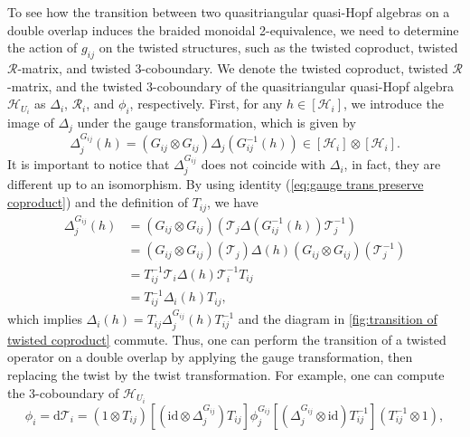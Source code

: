 \documentclass[reqno]{amsart}
\theoremstyle{definition}
\theoremstyle{remark}
\begin{document}
To see how the transition between two quasitriangular quasi-Hopf algebras on a double overlap induces the braided monoidal 2-equivalence, we need to determine the action of $g_{ij}$ on the twisted structures, such as the twisted coproduct, twisted $\mathcal{R}$-matrix, and twisted 3-coboundary. We denote the twisted coproduct, twisted $\mathcal{R}$-matrix, and the twisted 3-coboundary of the quasitriangular quasi-Hopf algebra $\mathscr{H}_{U_i}$ as $\Delta_i$, $\mathcal{R}_i$, and $\phi_i$, respectively. First, for any $h\in \left[\mathscr{H}_i\right]$, we introduce the image of $\Delta_j$ under the gauge transformation, which is given by
\begin{equation}
    \Delta_j^{G_{ij}}(h) = \left(G_{ij}\otimes G_{ij}\right)\Delta_j\left(G_{ij}^{-1}(h)\right) \in \left[\mathscr{H}_i\right] \otimes \left[\mathscr{H}_i\right].
\end{equation}
It is important to notice that $\Delta_j^{G_{ij}}$ does not coincide with $\Delta_i$, in fact, they are different up to an isomorphism. By using identity (\ref{eq:gauge trans preserve coproduct}) and the definition of $T_{ij}$, we have
\begin{equation}
    \begin{split}
        \Delta_j^{G_{ij}}(h)&= \left(G_{ij}\otimes G_{ij}\right)\left(\mathcal{T}_j\Delta\left(G_{ij}^{-1}(h)\right) \mathcal{T}_j^{-1}\right) \\
        &= \left(G_{ij}\otimes G_{ij}\right)(\mathcal{T}_j)\Delta(h)  \left(G_{ij}\otimes G_{ij}\right)(\mathcal{T}_j^{-1})\\
        &=T_{ij}^{-1}\mathcal{T}_i \Delta(h) \mathcal{T}_i^{-1} T_{ij}\\
        &=T_{ij}^{-1} \Delta_i(h)  T_{ij},
    \end{split}
\end{equation}
which implies $\Delta_i(h) = T_{ij}\Delta_j^{G_{ij}}(h)T_{ij}^{-1}$ and the diagram in \cref{fig:transition of twisted coproduct} commute. Thus, one can perform the transition of a twisted operator on a double overlap by applying the gauge transformation, then replacing the twist by the twist transformation. For example, one can compute the 3-coboundary of $\mathscr{H}_{U_i}$
\begin{equation}
     \phi_i =\text{d}\mathcal{T}_i= \left(1\otimes T_{ij}\right)\left[\left(\textrm{id}\otimes\Delta_j^{G_{ij}}\right) T_{ij}\right]\phi_j^{G_{ij}} \left[\left(\Delta_j^{G_{ij}} \otimes \textrm{id}\right)T_{ij}^{-1}\right]\left(T_{ij}^{-1}\otimes 1\right),
\end{equation}
\end{document}
